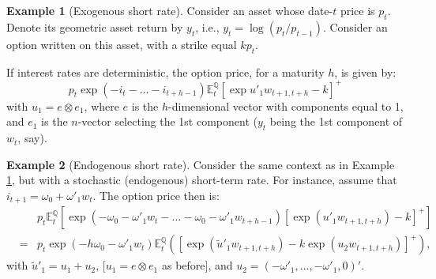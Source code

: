 \documentclass[
  12pt,
]{book}
\theoremstyle{definition}
\theoremstyle{definition}
\newtheorem{example}{Example}[chapter]
\theoremstyle{definition}
\theoremstyle{definition}
\theoremstyle{remark}
\begin{document}
\begin{example}[Exogenous short rate]
\protect\hypertarget{exm:ExogSTR}{}\label{exm:ExogSTR}Consider an asset whose date-\(t\) price is \(p_t\). Denote its geometric asset return by \(y_t\), i.e., \(y_t = \log(p_t/p_{t-1})\). Consider an option written on this asset, with a strike equal \(k p_t\).

If interest rates are deterministic, the option price, for a maturity \(h\), is given by:
\[
p_t   \exp(-i_{t}-\dots-i_{t+h-1}) \mathbb{E}^{\mathbb{Q}}_t[\exp   u'_1 w_{t+1, t+h} - k]^+
\]
with \(u_1 = e \otimes e_1\), where \(e\) is the \(h\)-dimensional vector with components equal to 1, and \(e_1\) is the \(n\)-vector selecting the 1st component (\(y_t\) being the 1st component of \(w_t\), say).
\end{example}

\begin{example}[Endogenous short rate]
\protect\hypertarget{exm:EndogSTR}{}\label{exm:EndogSTR}Consider the same context as in Example \ref{exm:ExogSTR}, but with a stochastic (endogenous) short-term rate. For instance, assume that \(i_{t+1} = \omega_0 + \omega'_1 w_t\). The option price then is:
\begin{eqnarray*}
&& p_t \mathbb{E}^{\mathbb{Q}}_t  \left[ \exp(-\omega_0 - \omega'_1 w_t-\dots- \omega_0 - \omega'_1 w_{t+h-1}) [\exp(u'_1 w_{t+1,t+h})-k]^+ \right]\\
&= & p_t   \exp(-h \omega_0 - \omega'_1 w_t)\mathbb{E}^{\mathbb{Q}}_t\left(\left[\exp(\tilde{u}'_1w_{t+1,t+h})-k   \exp(u_2 w_{t+1, t+h})\right]^+\right),
\end{eqnarray*}
with \(\tilde{u}'_1 = u_1 + u_2\), {[}\(u_1 = e \otimes e_1\) as before{]}, and \(u_2 = (-\omega'_1,\dots, -\omega'_1, 0)'\).
\end{example}
\end{document}

